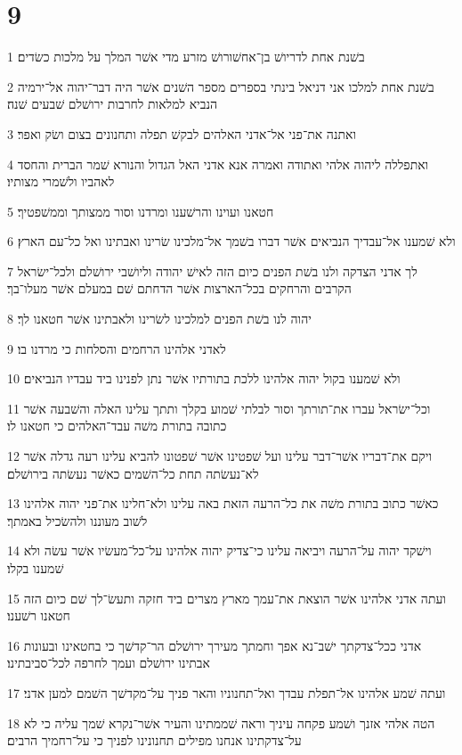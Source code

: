 \chapter{9}

\par 1 בשׁנת אחת לדריושׁ בן־אחשׁורושׁ מזרע מדי אשׁר המלך על מלכות כשׂדים׃
\par 2 בשׁנת אחת למלכו אני דניאל בינתי בספרים מספר השׁנים אשׁר היה דבר־יהוה אל־ירמיה הנביא למלאות לחרבות ירושׁלם שׁבעים שׁנה׃
\par 3 ואתנה את־פני אל־אדני האלהים לבקשׁ תפלה ותחנונים בצום ושׂק ואפר׃
\par 4 ואתפללה ליהוה אלהי ואתודה ואמרה אנא אדני האל הגדול והנורא שׁמר הברית והחסד לאהביו ולשׁמרי מצותיו׃
\par 5 חטאנו ועוינו והרשׁענו ומרדנו וסור ממצותך וממשׁפטיך׃
\par 6 ולא שׁמענו אל־עבדיך הנביאים אשׁר דברו בשׁמך אל־מלכינו שׂרינו ואבתינו ואל כל־עם הארץ׃
\par 7 לך אדני הצדקה ולנו בשׁת הפנים כיום הזה לאישׁ יהודה וליושׁבי ירושׁלם ולכל־ישׂראל הקרבים והרחקים בכל־הארצות אשׁר הדחתם שׁם במעלם אשׁר מעלו־בך׃
\par 8 יהוה לנו בשׁת הפנים למלכינו לשׂרינו ולאבתינו אשׁר חטאנו לך׃
\par 9 לאדני אלהינו הרחמים והסלחות כי מרדנו בו׃
\par 10 ולא שׁמענו בקול יהוה אלהינו ללכת בתורתיו אשׁר נתן לפנינו ביד עבדיו הנביאים׃
\par 11 וכל־ישׂראל עברו את־תורתך וסור לבלתי שׁמוע בקלך ותתך עלינו האלה והשׁבעה אשׁר כתובה בתורת משׁה עבד־האלהים כי חטאנו לו׃
\par 12 ויקם את־דבריו אשׁר־דבר עלינו ועל שׁפטינו אשׁר שׁפטונו להביא עלינו רעה גדלה אשׁר לא־נעשׂתה תחת כל־השׁמים כאשׁר נעשׂתה בירושׁלם׃
\par 13 כאשׁר כתוב בתורת משׁה את כל־הרעה הזאת באה עלינו ולא־חלינו את־פני יהוה אלהינו לשׁוב מעוננו ולהשׂכיל באמתך׃
\par 14 וישׁקד יהוה על־הרעה ויביאה עלינו כי־צדיק יהוה אלהינו על־כל־מעשׂיו אשׁר עשׂה ולא שׁמענו בקלו׃
\par 15 ועתה אדני אלהינו אשׁר הוצאת את־עמך מארץ מצרים ביד חזקה ותעשׂ־לך שׁם כיום הזה חטאנו רשׁענו׃
\par 16 אדני ככל־צדקתך ישׁב־נא אפך וחמתך מעירך ירושׁלם הר־קדשׁך כי בחטאינו ובעונות אבתינו ירושׁלם ועמך לחרפה לכל־סביבתינו׃
\par 17 ועתה שׁמע אלהינו אל־תפלת עבדך ואל־תחנוניו והאר פניך על־מקדשׁך השׁמם למען אדני׃
\par 18 הטה אלהי אזנך ושׁמע פקחה עיניך וראה שׁממתינו והעיר אשׁר־נקרא שׁמך עליה כי לא על־צדקתינו אנחנו מפילים תחנונינו לפניך כי על־רחמיך הרבים׃
